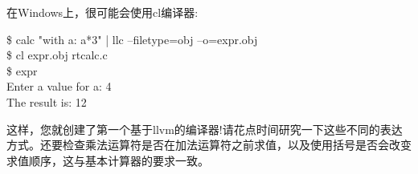 在Windows上，很可能会使用cl编译器:\par

\begin{tcolorbox}[colback=white,colframe=black]
\$ calc "with a: a*3" | llc –filetype=obj –o=expr.obj \\
\$ cl expr.obj rtcalc.c \\
\$ expr \\
\hspace*{0.5cm}Enter a value for a: 4 \\
\hspace*{0.5cm}The result is: 12
\end{tcolorbox}

这样，您就创建了第一个基于llvm的编译器!请花点时间研究一下这些不同的表达方式。还要检查乘法运算符是否在加法运算符之前求值，以及使用括号是否会改变求值顺序，这与基本计算器的要求一致。\par








